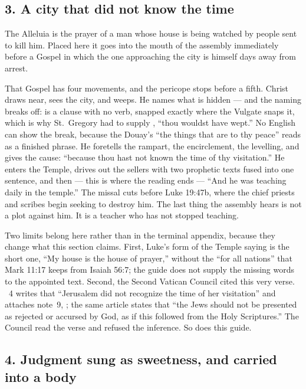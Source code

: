 \subsection*{3. A city that did not know the time}

The Alleluia is the prayer of a man whose house is being watched by people
sent to kill him. Placed here it goes into the mouth of the assembly
immediately before a Gospel in which the one approaching the city is himself
days away from arrest.

That Gospel has four movements, and the pericope stops before a fifth. Christ
draws near, sees the city, and weeps. He names what is hidden --- and the
naming breaks off:  is a clause with no verb, snapped
exactly where the Vulgate snaps it, which is why St.~Gregory had to supply
, ``thou wouldst have wept.'' No English can show the break,
because the Douay's ``the things that are to thy peace'' reads as a finished
phrase. He foretells the rampart, the encirclement, the levelling, and gives
the cause: ``because thou hast not known the time of thy visitation.'' He
enters the Temple, drives out the sellers with two prophetic texts fused into
one sentence, and then --- this is where the reading ends --- ``And he was
teaching daily in the temple.'' The missal cuts before Luke 19:47b, where the
chief priests and scribes begin seeking to destroy him. The last thing the
assembly hears is not a plot against him. It is a teacher who has not stopped
teaching.

Two limits belong here rather than in the terminal appendix, because they
change what this section claims. First, Luke's form of the Temple saying is
the short one, ``My house is the house of prayer,'' without the ``for all
nations'' that Mark 11:17 keeps from Isaiah 56:7; the guide does not supply
the missing words to the appointed text. Second, the Second Vatican Council
cited this very verse. ~4 writes that ``Jerusalem did not
recognize the time of her visitation'' and attaches note~9, ; the same article states that ``the Jews should not be presented as
rejected or accursed by God, as if this followed from the Holy Scriptures.''
The Council read the verse and refused the inference. So does this guide.

\subsection*{4. Judgment sung as sweetness, and carried into a body}

